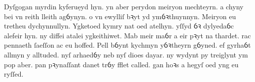 
Dyſgogan myrdin kyferu\d{e}yd hyn. \newline
yn aber perydon meiryon mechteyrn. \newline
a chyny bei vn reith lleith agỽynyn. \newline
o vn ewylliſ bꝛyt yd ymỽꝛthuynnyn. \newline
Meiryon eu tretheu dychynnullyn. \newline
Ygketoed kymry nat oed atelhyn. \newline
yſſyd ỽꝛ dylyedaỽc alefeir hyn. \newline
ny diffei atalei ygkeithiwet. \newline
Mab meir maỽr a eir pꝛyt na thardet. \newline
rac pennaeth ſaeſſon ac eu hoffed. \newline
Pell bỽynt kychmyn yỽꝛtheyrn gỽyned. \newline
ef gyrhaỽt allmyn y alltuded. \newline
nyſ arhaedỽy neb nyſ dioes dayar. \newline
ny wydynt py treiglynt ym pop aber. \newline
pan pꝛynaſſant danet trỽy fflet called. \newline
gan hoꝛs a hegyſ oed yng eu ryſſed.


